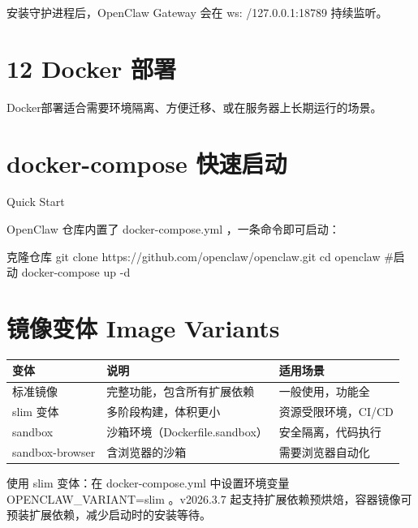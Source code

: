 \documentclass[
  10
]{article}
\newenvironment{Shaded}{}{}
\newcommand{\NormalTok}[1]{#1}
\newcounter{none} %
\begin{document}
安装守护进程后，OpenClaw Gateway 会在 ws: /127.0.0.1:18789 持续监听。

\section{12 Docker 部署}\label{docker-ux90e8ux7f72}

Docker部署适合需要环境隔离、方便迁移、或在服务器上长期运行的场景。

\section{docker-compose
快速启动}\label{docker-compose-ux5febux901fux542fux52a8}

Quick Start

OpenClaw 仓库内置了 docker-compose.yml ，一条命令即可启动：

\begin{Shaded}
\begin{Highlighting}[]
\NormalTok{克隆仓库  }
\NormalTok{git clone https://github.com/openclaw/openclaw.git  }
\NormalTok{cd openclaw  }
\NormalTok{\#启动  }
\NormalTok{docker{-}compose up {-}d}
\end{Highlighting}
\end{Shaded}

\section{镜像变体 Image
Variants}\label{ux955cux50cfux53d8ux4f53-image-variants}

{\def\LTcaptype{none} %
\begin{longtable}[]{@{}|l|l|l|@{}}
\toprule\noalign{}
\endhead
\bottomrule\noalign{}
\endlastfoot
\hline
变体 & 说明 & 适用场景 \\
\hline
标准镜像 & 完整功能，包含所有扩展依赖 & 一般使用，功能全 \\
\hline
slim 变体 & 多阶段构建，体积更小 & 资源受限环境，CI/CD \\
\hline
sandbox & 沙箱环境（Dockerfile.sandbox） & 安全隔离，代码执行 \\
\hline
sandbox-browser & 含浏览器的沙箱 & 需要浏览器自动化 \\
\hline
\end{longtable}
}

使用 slim 变体：在 docker-compose.yml 中设置环境变量
OPENCLAW\_VARIANT=slim 。v2026.3.7
起支持扩展依赖预烘焙，容器镜像可预装扩展依赖，减少启动时的安装等待。
\end{document}
